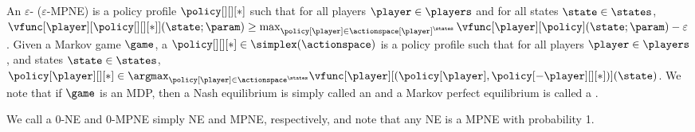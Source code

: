 An $\varepsilon$- ($\varepsilon$-MPNE) is a policy profile $\policy[][][*]$ such that for all players $\player \in \players$ and for all states $\state \in \states$, $\vfunc[\player][{\policy[][][*]}](\state; \param) \geq \max_{\policy[\player] \in \actionspace[\player]^\states} \vfunc[\player][\policy](\state; \param) - \varepsilon$.  
Given a Markov game $\game$, a  $\policy[][][*] \in \simplex(\actionspace)$ is a policy profile such that for all players $\player \in \players$, and states $\state \in \states$, $\policy[\player][][*] \in \argmax_{\policy[\player] \in \actionspace^\states} \vfunc[\player][{(\policy[\player], \policy[-\player][][*])}](\state)$. We note that if $\game$ is an MDP, then a Nash equilibrium is simply called an  and a Markov perfect equilibrium is called a .

We call a $0$-NE and $0$-MPNE simply NE and MPNE, respectively, and note that any NE is a MPNE with probability 1. 
\fi




